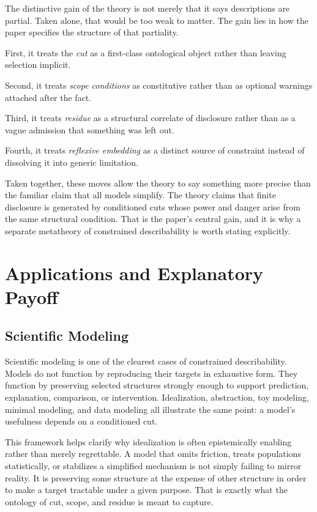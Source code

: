 \documentclass[11pt]{article}
\renewcommand{\emph}[1]{\textit{#1}}
\begin{document}
The distinctive gain of the theory is not merely that it says descriptions are partial. Taken alone, that would be too weak to matter. The gain lies in how the paper specifies the structure of that partiality.

First, it treats the \emph{cut} as a first-class ontological object rather than leaving selection implicit.

Second, it treats \emph{scope conditions} as constitutive rather than as optional warnings attached after the fact.

Third, it treats \emph{residue} as a structural correlate of disclosure rather than as a vague admission that something was left out.

Fourth, it treats \emph{reflexive embedding} as a distinct source of constraint instead of dissolving it into generic limitation.

Taken together, these moves allow the theory to say something more precise than the familiar claim that all models simplify. The theory claims that finite disclosure is generated by conditioned cuts whose power and danger arise from the same structural condition. That is the paper's central gain, and it is why a separate metatheory of constrained describability is worth stating explicitly.

\section{Applications and Explanatory Payoff}

\subsection{Scientific Modeling}

Scientific modeling is one of the clearest cases of constrained describability. Models do not function by reproducing their targets in exhaustive form. They function by preserving selected structures strongly enough to support prediction, explanation, comparison, or intervention. Idealization, abstraction, toy modeling, minimal modeling, and data modeling all illustrate the same point: a model's usefulness depends on a conditioned cut. \cite{frigg_hartmann_models_sep,frigg_nguyen_scientific_representation_sep}

This framework helps clarify why idealization is often epistemically enabling rather than merely regrettable. A model that omits friction, treats populations statistically, or stabilizes a simplified mechanism is not simply failing to mirror reality. It is preserving some structure at the expense of other structure in order to make a target tractable under a given purpose. That is exactly what the ontology of cut, scope, and residue is meant to capture. \cite{frigg_hartmann_models_sep}
\end{document}
